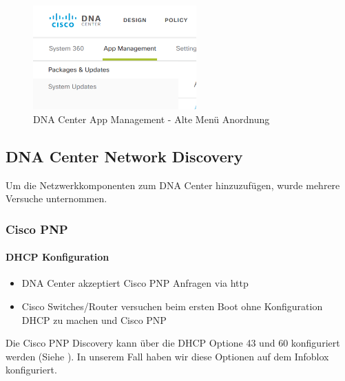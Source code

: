 \begin{figure}[H]
	\centering
	\includegraphics[height=4cm]{img/sc_010.png}
	\caption{DNA Center App Management - Alte Menü Anordnung}
	\label{fig:dna-center-gui-update-2}
\end{figure}

\subsection{DNA Center Network Discovery}

Um die Netzwerkkomponenten zum DNA Center hinzuzufügen, wurde mehrere Versuche unternommen. 

\subsubsection{Cisco PNP}

\paragraph{DHCP Konfiguration}

\begin{itemize}
	\item DNA Center akzeptiert Cisco PNP Anfragen via http
	\item Cisco Switches/Router versuchen beim ersten Boot ohne Konfiguration DHCP zu machen und Cisco PNP
\end{itemize}

Die Cisco PNP Discovery kann über die DHCP Optione 43 und 60 konfiguriert werden (Siehe \cite{cisco-pnp-dhcp}). In unserem Fall haben wir diese Optionen auf dem Infoblox konfiguriert.

